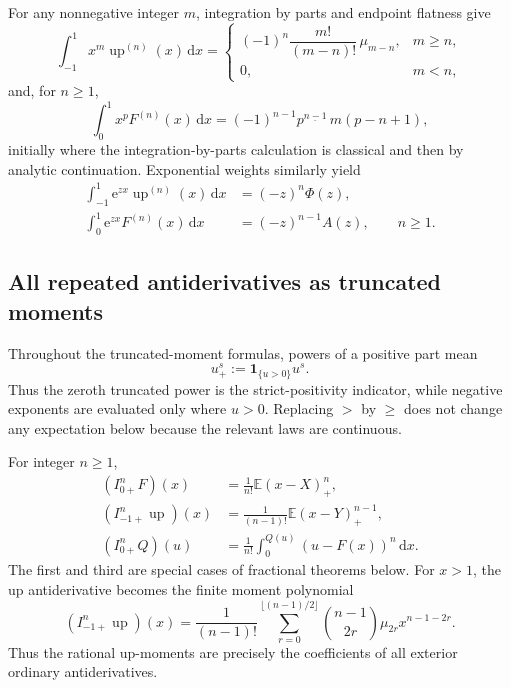 \documentclass[11pt,oneside]{article}
\numberwithin{equation}{section}
\theoremstyle{definition}
\theoremstyle{remark}
\newcommand{\Up}{\operatorname{up}}
\newcommand{\e}{\mathrm e}
\newcommand{\dd}{\,\mathrm d}
\newcommand{\E}{\mathbb E}
\newcommand{\fall}[2]{#1^{\underline{#2}}}
\newcommand{\QF}{Q}
\begin{document}
For any nonnegative integer \(m\), integration by parts and endpoint flatness
give
\begin{equation}
 \int_{-1}^1x^m\Up^{(n)}(x)\dd x
 =\begin{cases}
 (-1)^n\dfrac{m!}{(m-n)!}\,\mu_{m-n},&m\ge n,\\[0.8em]
 0,&m<n,
 \end{cases}
 \label{eq:up-derivative-moments}
\end{equation}
and, for \(n\ge1\),
\begin{equation}
 \boxed{
 \int_0^1x^pF^{(n)}(x)\dd x
 =(-1)^{n-1}\fall{p}{n-1}\,m(p-n+1),}
 \label{eq:F-derivative-moments}
\end{equation}
initially where the integration-by-parts calculation is classical and then by
analytic continuation.  Exponential weights similarly yield
\begin{align}
 \int_{-1}^1\e^{zx}\Up^{(n)}(x)\dd x&=(-z)^n\Phi(z),
 \label{eq:up-derivative-exp}\\
 \int_0^1\e^{zx}F^{(n)}(x)\dd x&=(-z)^{n-1}A(z),\qquad n\ge1.
 \label{eq:F-derivative-exp}
\end{align}

\subsection{All repeated antiderivatives as truncated moments}

Throughout the truncated-moment formulas, powers of a positive part mean
\[
 u_+^s:=\mathbf 1_{\{u>0\}}u^s.
\]
Thus the zeroth truncated power is the strict-positivity indicator, while
negative exponents are evaluated only where \(u>0\).  Replacing \(>\) by
\(\ge\) does not change any expectation below because the relevant laws are
continuous.

For integer \(n\ge1\),
\begin{align}
 (I_{0+}^{n}F)(x)
 &=\frac1{n!}\E(x-X)_+^n,
 \label{eq:F-integer-primitive}\\
 (I_{-1+}^{n}\Up)(x)
 &=\frac1{(n-1)!}\E(x-Y)_+^{n-1},
 \label{eq:up-integer-primitive}\\
 (I_{0+}^{n}\QF)(u)
 &=\frac1{n!}\int_0^{\QF(u)}(u-F(x))^n\dd x.
 \label{eq:Q-integer-primitive}
\end{align}
The first and third are special cases of fractional theorems below.  For
\(x>1\), the up antiderivative becomes the finite moment polynomial
\begin{equation}
 (I_{-1+}^{n}\Up)(x)
 =\frac1{(n-1)!}
 \sum_{r=0}^{\lfloor(n-1)/2\rfloor}
 \binom{n-1}{2r}\mu_{2r}x^{n-1-2r}.
 \label{eq:up-exterior-polynomial}
\end{equation}
Thus the rational up-moments are precisely the coefficients of all exterior
ordinary antiderivatives.
\end{document}
